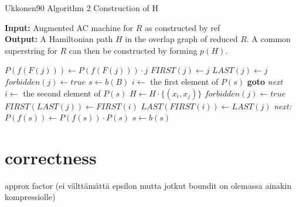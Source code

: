 \documentclass[english,twoside,censored,csm,algorithms-track-2020]{HYthesisML}
\theoremstyle{plain}
\theoremstyle{definition}
\begin{document}
  \begin{algorithm}
    \caption{Ukkonen90 Algorithm 2 Construction of H} \label{ukk-h}
    \hspace*{\algorithmicindent} \textbf{Input:} Augmented AC machine for $R$ as constructed by ref\\ %
    \hspace*{\algorithmicindent} \textbf{Output:} A Hamiltonian path $H$ in the overlap graph of reduced $R$. A common superstring for $R$ can then be constructed by forming $p(H)$.\\

    \begin{algorithmic}[1]
            \State $P(f(F(j)))\gets P(f(F(j)))\cdot {j}$
            \State $FIRST(j)\gets j$
            \State $LAST(j)\gets j$
          \Else
            \State $forbidden(j)\gets true$
          \EndIf
        \EndFor  
        \State $s\gets b(B)$
              \State $i\gets$ the first element of $P(s)$
                  \hspace*{\algorithmicindent} \textbf{goto} \textit{next}
                \Else
                  \State $i\gets$ the second element of $P(s)$
                \EndIf
              \EndIf  
            \State $H\gets H\cdot \{(x_i,x_j)\}$
            \State $forbidden(j)\gets true$
            \State $FIRST(LAST(j))\gets FIRST(i)$
            \State $LAST(FIRST(i))\gets LAST(j)$
            \hspace*{\algorithmicindent} \textit{next:}
            \EndFor
          \State $P(f(s))\gets P(f(s))\cdot P(s)$
          \EndIf
          \State $s\gets b(s)$
        \EndWhile
      \EndFunction
    \end{algorithmic}
  \end{algorithm}
  


  \section{correctness}
  

  approx factor (ei välttämättä epsilon mutta jotkut boundit on olemassa ainakin kompressiolle)
\end{document}
